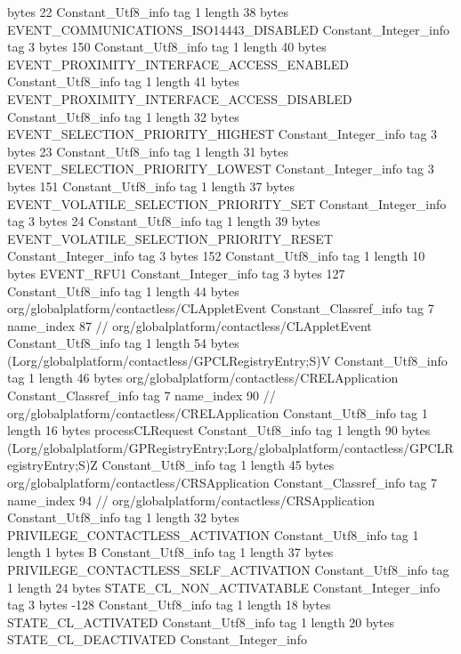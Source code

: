 {{{			bytes	22
		}
		Constant_Utf8_info {
			tag	1
			length	38
			bytes	EVENT_COMMUNICATIONS_ISO14443_DISABLED
		}
		Constant_Integer_info {
			tag	3
			bytes	150
		}
		Constant_Utf8_info {
			tag	1
			length	40
			bytes	EVENT_PROXIMITY_INTERFACE_ACCESS_ENABLED
		}
		Constant_Utf8_info {
			tag	1
			length	41
			bytes	EVENT_PROXIMITY_INTERFACE_ACCESS_DISABLED
		}
		Constant_Utf8_info {
			tag	1
			length	32
			bytes	EVENT_SELECTION_PRIORITY_HIGHEST
		}
		Constant_Integer_info {
			tag	3
			bytes	23
		}
		Constant_Utf8_info {
			tag	1
			length	31
			bytes	EVENT_SELECTION_PRIORITY_LOWEST
		}
		Constant_Integer_info {
			tag	3
			bytes	151
		}
		Constant_Utf8_info {
			tag	1
			length	37
			bytes	EVENT_VOLATILE_SELECTION_PRIORITY_SET
		}
		Constant_Integer_info {
			tag	3
			bytes	24
		}
		Constant_Utf8_info {
			tag	1
			length	39
			bytes	EVENT_VOLATILE_SELECTION_PRIORITY_RESET
		}
		Constant_Integer_info {
			tag	3
			bytes	152
		}
		Constant_Utf8_info {
			tag	1
			length	10
			bytes	EVENT_RFU1
		}
		Constant_Integer_info {
			tag	3
			bytes	127
		}
		Constant_Utf8_info {
			tag	1
			length	44
			bytes	org/globalplatform/contactless/CLAppletEvent
		}
		Constant_Classref_info {
			tag	7
			name_index	87		// org/globalplatform/contactless/CLAppletEvent
		}
		Constant_Utf8_info {
			tag	1
			length	54
			bytes	(Lorg/globalplatform/contactless/GPCLRegistryEntry;S)V
		}
		Constant_Utf8_info {
			tag	1
			length	46
			bytes	org/globalplatform/contactless/CRELApplication
		}
		Constant_Classref_info {
			tag	7
			name_index	90		// org/globalplatform/contactless/CRELApplication
		}
		Constant_Utf8_info {
			tag	1
			length	16
			bytes	processCLRequest
		}
		Constant_Utf8_info {
			tag	1
			length	90
			bytes	(Lorg/globalplatform/GPRegistryEntry;Lorg/globalplatform/contactless/GPCLRegistryEntry;S)Z
		}
		Constant_Utf8_info {
			tag	1
			length	45
			bytes	org/globalplatform/contactless/CRSApplication
		}
		Constant_Classref_info {
			tag	7
			name_index	94		// org/globalplatform/contactless/CRSApplication
		}
		Constant_Utf8_info {
			tag	1
			length	32
			bytes	PRIVILEGE_CONTACTLESS_ACTIVATION
		}
		Constant_Utf8_info {
			tag	1
			length	1
			bytes	B
		}
		Constant_Utf8_info {
			tag	1
			length	37
			bytes	PRIVILEGE_CONTACTLESS_SELF_ACTIVATION
		}
		Constant_Utf8_info {
			tag	1
			length	24
			bytes	STATE_CL_NON_ACTIVATABLE
		}
		Constant_Integer_info {
			tag	3
			bytes	-128
		}
		Constant_Utf8_info {
			tag	1
			length	18
			bytes	STATE_CL_ACTIVATED
		}
		Constant_Utf8_info {
			tag	1
			length	20
			bytes	STATE_CL_DEACTIVATED
		}
		Constant_Integer_info {
}}}
